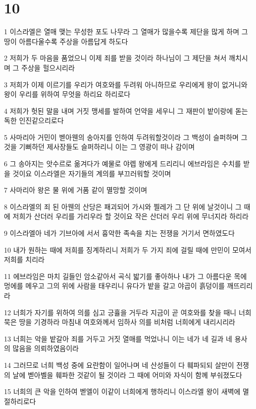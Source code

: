 \chapter{10}

\par 1 이스라엘은 열매 맺는 무성한 포도 나무라 그 열매가 많을수록 제단을 많게 하며 그 땅이 아름다울수록 주상을 아름답게 하도다
\par 2 저희가 두 마음을 품었으니 이제 죄를 받을 것이라 하나님이 그 제단을 쳐서 깨치시며 그 주상을 헐으시리라
\par 3 저희가 이제 이르기를 우리가 여호와를 두려워 아니하므로 우리에게 왕이 없거니와 왕이 우리를 위하여 무엇을 하리요 하리로다
\par 4 저희가 헛된 말을 내며 거짓 맹세를 발하여 언약을 세우니 그 재판이 밭이랑에 돋는 독한 인진같으리로다
\par 5 사마리아 거민이 벧아웬의 송아지를 인하여 두려워할것이라 그 백성이 슬퍼하며 그것을 기뻐하던 제사장들도 슬퍼하리니 이는 그 영광이 떠나 감이며
\par 6 그 송아지는 앗수르로 옮겨다가 예물로 야렙 왕에게 드리리니 에브라임은 수치를 받을 것이요 이스라엘은 자기들의 계의를 부끄러워할 것이며
\par 7 사마리아 왕은 물 위에 거품 같이 멸망할 것이며
\par 8 이스라엘의 죄 된 아웬의 산당은 패괴되어 가시와 찔레가 그 단 위에 날것이니 그 때에 저희가 산더러 우리를 가리우라 할 것이요 작은 산더러 우리 위에 무너지라 하리라
\par 9 이스라엘아 네가 기브아에 서서 흉악한 족속을 치는 전쟁을 거기서 면하였도다
\par 10 내가 원하는 때에 저희를 징계하리니 저희가 두 가지 죄에 걸릴 때에 만민이 모여서 저희를 치리라
\par 11 에브라임은 마치 길들인 암소같아서 곡식 밟기를 좋아하나 내가 그 아름다운 목에 멍에를 메우고 그의 위에 사람을 태우리니 유다가 밭을 갈고 야곱이 흙덩이를 깨뜨리리라
\par 12 너희가 자기를 위하여 의를 심고 긍휼을 거두라 지금이 곧 여호와를 찾을 때니 너희 묵은 땅을 기경하라 마침내 여호와께서 임하사 의를 비처럼 너희에게 내리시리라
\par 13 너희는 악을 밭갈아 죄를 거두고 거짓 열매를 먹었나니 이는 네가 네 길과 네 용사의 많음을 의뢰하였음이라
\par 14 그러므로 너희 백성 중에 요란함이 일어나며 네 산성들이 다 훼파되되 살만이 전쟁의 날에 벧아벨을 훼파한 것같이 될 것이라 그 때에 어미와 자식이 함께 부숴졌도다
\par 15 너희의 큰 악을 인하여 벧엘이 이같이 너희에게 행하리니 이스라엘 왕이 새벽에 멸절하리로다

